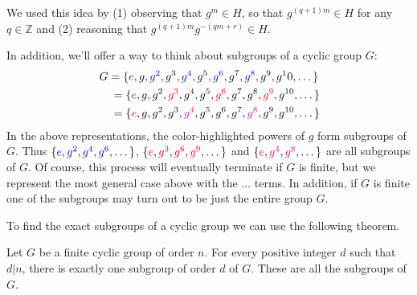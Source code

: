     We used this idea by (1) observing that $g^m \in H$, so that
    $g^{(q+1)m} \in H$ for any $q \in \mathbb{Z}$ and (2) reasoning
    that $g^{(q+1)m}g^{-(qm + r)} \in H$.

    In addition, we'll offer a way to think about subgroups of a
    cyclic group $G$:
    \begin{gather}
        G = \{{\color{blue}e}, g, {\color{blue}g^2}, g^3, {\color{blue}g^4}, g^5, {\color{blue}g^6}, g^7, {\color{blue}g^8}, g^9, g^10, \dots\}\\
          \hspace{0.5cm}= \{{\color{red}e}, g, g^2, {\color{red}g^3}, g^4, g^5, {\color{red}g^6}, g^7, g^8, {\color{red}g^9}, g^{10}, \dots\}\\
          \hspace{0.5cm}= \{{\color{magenta}e}, g, g^2, g^3, {\color{magenta}g^4}, g^5, g^6, g^7, {\color{magenta}g^8}, g^9, g^{10}, \dots\}
    \end{gather}
    In the above representations, the color-highlighted powers of $g$
    form subgroups of $G$. Thus $\{{\color{blue}e}, {\color{blue}g^2},
    {\color{blue}g^4}, {\color{blue}g^6}, \dots\}$, 
    $\{{\color{red}e}, {\color{red}g^3},
    {\color{red}g^6}, {\color{red}g^9}, \dots \}$ and $\{{\color{magenta}e}, {\color{magenta}g^4},
    {\color{magenta}g^8}, \dots\}$ are
    all subgroups of $G$. Of course, this process will eventually terminate if
    $G$ is finite, but we represent the most general case above with
    the $\dots$ terms. In addition, if $G$ is finite one of the
    subgroups may turn out to be just the entire group $G$. 

    To find the exact subgroups of a cyclic group we can use the
    following theorem. 

    \begin{thm}
        Let $G$ be a finite cyclic group of order $n$. For every positive
        integer $d$ such that $d|n$, there is exactly one subgroup of
        order $d$ of $G$. These are all the subgroups of $G$. 
    \end{thm} 

